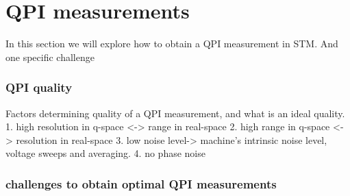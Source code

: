 \section{QPI measurements}
In this section we will explore how to obtain a QPI measurement in \ac{STM}. And one specific challenge 

\subsubsection{QPI quality}
Factors determining quality of a QPI measurement, and what is an ideal quality. 
1. high resolution in q-space <-> range in real-space
2. high range in q-space <-> resolution in real-space
3. low noise level-> machine's intrinsic noise level, voltage sweeps and averaging.
4. no phase noise 
\subsubsection{challenges to obtain optimal QPI measurements}